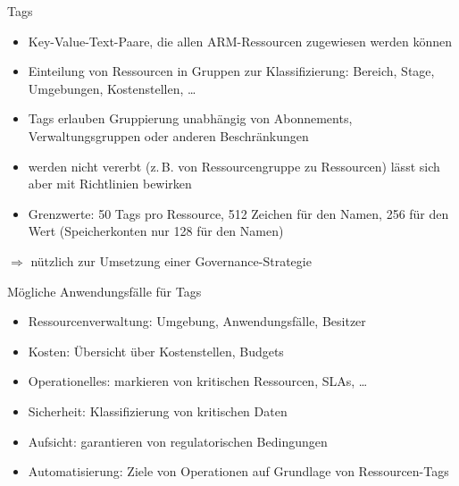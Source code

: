 

\begin{flashcard}[Definition]{Tags}
  \begin{itemize}
    \item Key-Value-Text-Paare, die allen ARM-Ressourcen zugewiesen werden können
    \item Einteilung von Ressourcen in Gruppen zur Klassifizierung:\newline
      Bereich, Stage, Umgebungen, Kostenstellen, \ldots
    \item Tags erlauben Gruppierung unabhängig von Abonnements, Verwaltungsgruppen oder anderen Beschränkungen
    \item werden nicht vererbt (z.\,B. von Ressourcengruppe zu Ressourcen)\newline
      lässt sich aber mit Richtlinien bewirken
    \item Grenzwerte: 50 Tags pro Ressource, 512 Zeichen für den Namen, 256 für den Wert\newline
      (Speicherkonten nur 128 für den Namen)
  \end{itemize}
  $\Rightarrow$ nützlich zur Umsetzung einer Governance-Strategie
\end{flashcard}

\begin{flashcard}[Definition]{Mögliche Anwendungsfälle für Tags}
  \begin{itemize}
    \item Ressourcenverwaltung: Umgebung, Anwendungsfälle, Besitzer
    \item Kosten: Übersicht über Kostenstellen, Budgets
    \item Operationelles: markieren von kritischen Ressourcen, SLAs, \ldots
    \item Sicherheit: Klassifizierung von kritischen Daten
    \item Aufsicht: garantieren von regulatorischen Bedingungen
    \item Automatisierung: Ziele von Operationen auf Grundlage von Ressourcen-Tags
  \end{itemize}
\end{flashcard}

